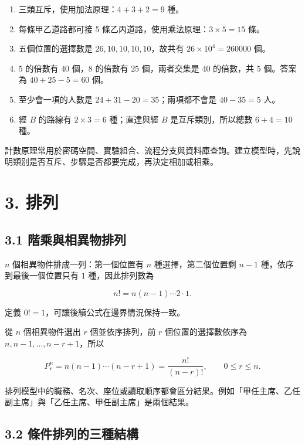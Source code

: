 \documentclass[11pt,a4paper]{article}
\providecommand{\tightlist}{%
  \setlength{\itemsep}{0pt}\setlength{\parskip}{0pt}}
\begin{document}
\begin{enumerate}
\def\labelenumi{\arabic{enumi}.}
\tightlist
\item
  三類互斥，使用加法原理：\(4+3+2=9\) 種。
\item
  每條甲乙道路都可接 5 條乙丙道路，使用乘法原理：\(3\times5=15\) 條。
\item
  五個位置的選擇數是 \(26,10,10,10,10\)，故共有 \(26\times10^4=260000\) 個。
\item
  \(5\) 的倍數有 \(40\) 個，\(8\) 的倍數有 \(25\) 個，兩者交集是 \(40\) 的倍數，共 \(5\) 個。答案為 \(40+25-5=60\) 個。
\item
  至少會一項的人數是 \(24+31-20=35\)；兩項都不會是 \(40-35=5\) 人。
\item
  經 \(B\) 的路線有 \(2\times3=6\) 種；直達與經 \(B\) 是互斥類別，所以總數 \(6+4=10\) 種。
\end{enumerate}

計數原理常用於密碼空間、實驗組合、流程分支與資料庫查詢。建立模型時，先說明類別是否互斥、步驟是否都要完成，再決定相加或相乘。

\section{3. 排列}\label{ux6392ux5217}

\subsection{3.1 階乘與相異物排列}\label{ux968eux4e58ux8207ux76f8ux7570ux7269ux6392ux5217}

\(n\) 個相異物件排成一列：第一個位置有 \(n\) 種選擇，第二個位置剩 \(n-1\) 種，依序到最後一個位置只有 \(1\) 種，因此排列數為

\[
n!=n(n-1)\cdots2\cdot1.
\]

定義 \(0!=1\)，可讓後續公式在邊界情況保持一致。

從 \(n\) 個相異物件選出 \(r\) 個並依序排列，前 \(r\) 個位置的選擇數依序為 \(n,n-1,\ldots,n-r+1\)，所以

\[
\boxed{P^n_r=n(n-1)\cdots(n-r+1)=\frac{n!}{(n-r)!}},
\qquad 0\le r\le n.
\]

排列模型中的職務、名次、座位或讀取順序都會區分結果。例如「甲任主席、乙任副主席」與「乙任主席、甲任副主席」是兩個結果。

\subsection{3.2 條件排列的三種結構}\label{ux689dux4ef6ux6392ux5217ux7684ux4e09ux7a2eux7d50ux69cb}
\end{document}
